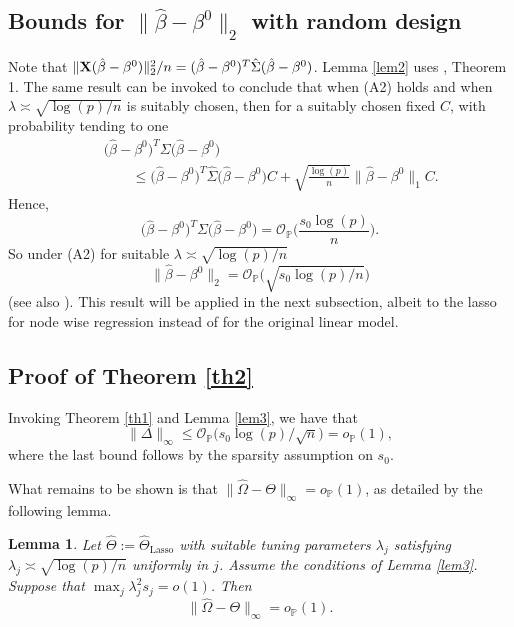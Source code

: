 \documentclass[aos,MSNbibl,dvips]{arximspdf}
\newtheorem{lemm}{Lemma}[section]
\newcommand{\PP}{\mathbb{P}}
\newcommand{\bx}{\mathbf{X}}
\begin{document}
\subsection{Bounds for \texorpdfstring{$\|\hat{\beta}-\beta^0\|_2$}{||beta-beta0||2} with random
design}\label{subsecell2bound}

Note that $\| {\bx} (\hat\beta- \beta^0 ) \|_2^2 /\break  n = (\hat\beta-
\beta^0 )^T \hat\Sigma(\hat\beta- \beta^0 ) $.
Lemma \ref{lem2} uses \cite{raskutti2010restricted}, Theorem 1. The
same result can be invoked
to conclude that when (A2) holds and when $\lambda\asymp\sqrt{\log
(p) / n }$ is suitably chosen, then
for a suitably chosen fixed $C$,
with probability tending to
one
%
\begin{eqnarray*}
&&\bigl(\hat\beta- \beta^0 \bigr)^T \Sigma\bigl(\hat\beta-
\beta^0 \bigr) %
\\
&&\qquad\le\bigl(\hat\beta- \beta^0 \bigr)^T \hat\Sigma\bigl(
\hat\beta- \beta^0 \bigr) C + \sqrt{\frac{\log(p)} {n}}\bigl \| \hat\beta-
\beta^0\bigr \|_1 C.
\end{eqnarray*}
%
Hence,
%
\[
\bigl(\hat\beta- \beta^0 \bigr)^T \Sigma\bigl(\hat\beta-
\beta^0 \bigr) = {\mathcal O}_{\PP} \biggl(
\frac{s_0 \log(p) }{n} \biggr). %
\]
%
So under (A2) for suitable $\lambda\asymp\sqrt{\log(p) / n }$
%
\begin{equation}
\label{ell2-bound} \bigl\|\hat{\beta} - \beta^0\bigr\|_2 = {\mathcal
O}_{\PP}\bigl(\sqrt{s_{0} \log(p)/n}\bigr)
\end{equation}
%
(see also \cite{brt09}). This result will be applied in the next
subsection, albeit to the
lasso for node wise regression instead of for the original linear model.

\subsection{Proof of Theorem \protect\ref{th2}}\label{subsecproofth2}

Invoking Theorem \ref{th1} and Lemma \ref{lem3}, we have that
%
\[
\|\Delta\|_{\infty} \le{\mathcal O}_{\PP}\bigl(s_{0}
\log(p) / \sqrt n \bigr) = o_{\PP}(1),
\]
%
where the last bound follows by the sparsity assumption on $s_{0}$.

What remains to be shown is that $\|\hat\Omega- \Theta\|_{\infty} =
o_{\PP}(1)$, as detailed by the following lemma.
%
\begin{lemm}\label{lem4} Let $\hat\Theta:= \hat\Theta_{\mathrm
{Lasso}}$ with suitable tuning
parameters $\lambda_j$ satisfying $\lambda_j \asymp\sqrt{ \log(p)/
n} $ uniformly in $j$.
Assume the conditions of Lemma \ref{lem3}.
Suppose that $\max_j \lambda_j^2
s_j= o(1)$. Then
%
\[
\|\hat\Omega- \Theta\|_{\infty} = o_{\PP}(1).
\]
%
\end{lemm}
\end{document}
